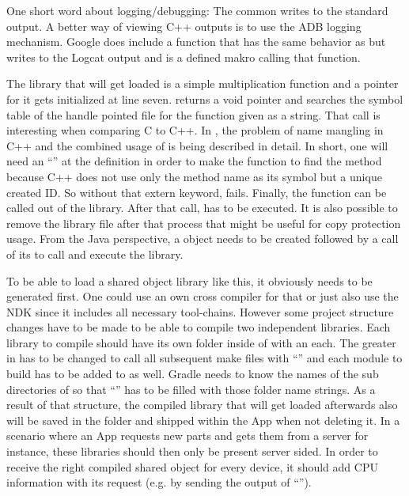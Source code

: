 One short word about logging/debugging: The common  writes to the standard output. A better way of viewing C++ outputs is to use the ADB logging mechanism. Google does include a  function that
has the same behavior as  but writes to the Logcat output and
 is a defined makro calling that function.

The library that will get loaded is a simple multiplication function and a pointer
for it gets initialized at line seven.  returns a void pointer and
 searches the symbol table of the handle pointed file for the function
given as a string. That call is interesting when comparing C to C++. In
\parencite{dlopen_howto}, the problem of name mangling in C++ and the combined usage of
 is being described in detail.
In short, one will need an ``'' at the  definition in order to make the  function to find the method
because C++ does not use only the method name as its symbol but a unique created ID.
So without that extern keyword,  fails.
Finally, the  function can be called out of the library.
After that call,  has to be executed. It is also possible to remove
the library file after that process that might be useful for copy protection usage.
From the Java perspective, a  object needs to be created followed by
a call of its  to call and execute the library.

To be able to load a shared object library like this, it obviously needs to be
generated first. One could use an own cross compiler for that or just also use
the NDK since it includes all necessary tool-chains.
However some project structure changes have to be made to be able to compile two independent libraries. Each library to compile should have its own folder inside
of  with an  each. The greater  in
 has to be changed to call all subsequent make files with
``'' and each module to build has to be
added to  as well. Gradle needs to know the names of the sub
directories of  so that ``'' has to be
filled with those folder name strings. As a result of that structure, the compiled
library that will get loaded afterwards also will be saved in the  folder
and shipped within the App when not deleting it. In a scenario where an App requests new
parts and gets them from a server for instance, these libraries should then only be
present server sided. In order to receive the right compiled shared object for every
device, it should add CPU information with its request (e.g. by sending the output
of ``'').

